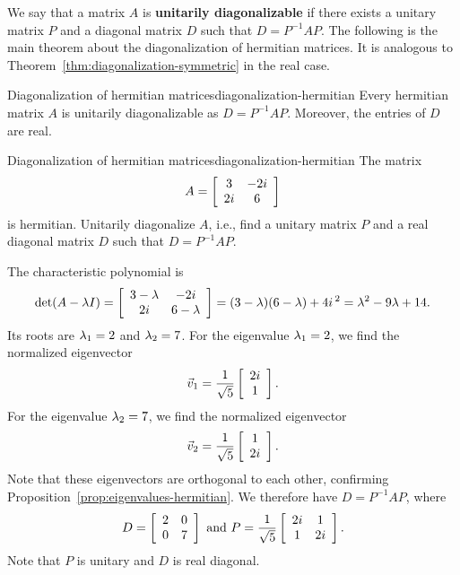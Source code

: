 \documentclass{ximera}
\begin{document}
We say that a matrix $A$ is \textbf{unitarily diagonalizable}%
%
%
%
%
 if there exists a unitary
matrix $P$ and a diagonal matrix $D$ such that $D = P^{-1}AP$.  The
following is the main theorem about the diagonalization of hermitian
matrices. It is analogous to
Theorem~\ref{thm:diagonalization-symmetric} in the real case.

\begin{theorem}{Diagonalization of hermitian matrices}{diagonalization-hermitian}
  Every hermitian matrix $A$ is unitarily diagonalizable as
  $D = P^{-1}AP$. Moreover, the entries of $D$ are real.
\end{theorem}

\begin{example}{Diagonalization of hermitian matrices}{diagonalization-hermitian}
  The matrix
  \begin{equation*}
    A = \startmat{cc}  3 & -2i \\ 2i & 6 \stopmat
  \end{equation*}
  is hermitian. Unitarily diagonalize $A$, i.e., find a unitary matrix
  $P$ and a real diagonal matrix $D$ such that $D = P^{-1}AP$.
\end{example}

\begin{solution}
  The characteristic polynomial is
  \begin{equation*}
    \det(A-\eigenvar I)
    = \startmat{cc} 3-\eigenvar & -2i \\ 2i & 6-\eigenvar \stopmat
    = (3-\eigenvar)(6-\eigenvar) + 4i\,^2
    = \eigenvar^2 - 9\eigenvar + 14.
  \end{equation*}
  Its roots are $\eigenvar_1=2$ and $\eigenvar_2=7$. For the eigenvalue
  $\eigenvar_1=2$, we find the normalized eigenvector
  \begin{equation*}
    \vect{v}_1 = \frac{1}{\sqrt{5}}\startmat{c} 2i \\ 1 \stopmat.
  \end{equation*}
  For the eigenvalue
  $\eigenvar_2=7$, we find the normalized eigenvector
  \begin{equation*}
    \vect{v}_2 = \frac{1}{\sqrt{5}}\startmat{c} 1 \\ 2i \stopmat.
  \end{equation*}
  Note that these eigenvectors are orthogonal to each other,
  confirming Proposition~\ref{prop:eigenvalues-hermitian}. We
  therefore have $D=P^{-1}AP$, where
  \begin{equation*}
    D = \startmat{cc} 2 & 0 \\ 0 & 7 \stopmat
    \quad\mbox{and}\quad
    P = \frac{1}{\sqrt{5}} \startmat{cc} 2i & 1 \\ 1 & 2i \stopmat.
  \end{equation*}
  Note that $P$ is unitary and $D$ is real diagonal.
\end{solution}
\end{document}
